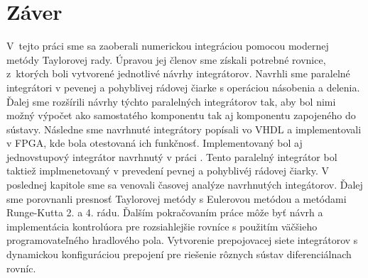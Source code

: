\chapter{Záver}
V~tejto práci sme sa zaoberali numerickou integráciou pomocou modernej metódy Taylorovej rady. Úpravou jej členov sme získali potrebné rovnice, z~ktorých boli vytvorené jednotlivé návrhy integrátorov. Navrhli sme paralelné integrátori v pevenej a pohyblivej rádovej čiarke s operáciou násobenia a delenia. Ďalej sme rozšírili návrhy týchto paralelných integrátorov tak, aby bol nimi možný výpočet ako samostatého komponentu tak aj komponentu zapojeného do sústavy. Následne sme navrhnuté integrátory popísali vo VHDL a implementovali v FPGA, kde bola otestovaná ich funkčnosť. Implementovaný bol aj jednovstupový integrátor navrhnutý v práci \cite{OpalkaDP}. Tento paralelný integrátor bol taktiež implmenetovaný v prevedení pevnej a pohyblivéj rádovej čiarky. V poslednej kapitole sme sa venovali časovej analýze navrhnutých integátorov. Ďalej sme porovnanli presnosť Taylorovej metódy s Eulerovou metódou a metódami Runge-Kutta 2. a 4. rádu.
Ďalším pokračovaním práce môže byť návrh a implementácia kontrolúora pre rozsiahlejšie rovníce s použitím väčšieho programovateľného hradlového pola. Vytvorenie prepojovacej siete integrátorov s dynamickou konfiguráciou prepojení pre riešenie rôznych sústav diferenciálnach rovníc.

